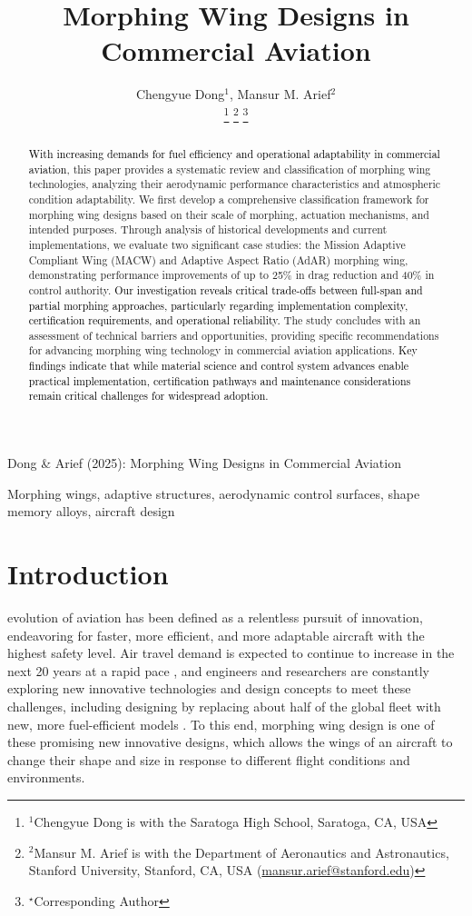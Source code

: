 \documentclass[letterpaper, journal, twoside]{IEEEtran}
\title{Morphing Wing Designs in Commercial Aviation}
\author{Chengyue Dong$^1$, Mansur M. Arief$^2$%

\thanks{$^1$Chengyue Dong is with the Saratoga High School, Saratoga, CA, USA}%
\thanks{$^2$Mansur M. Arief is with the Department of Aeronautics and Astronautics, Stanford University, Stanford, CA, USA (\url{mansur.arief@stanford.edu})
}%
\thanks{$^{\star}$Corresponding Author}%
}
\newcommand{\revision}[1]{\textcolor{black}{ #1}}
\begin{document}
{Dong \& Arief (2025): Morphing Wing Designs in Commercial Aviation}

\maketitle

\begin{abstract}
\revision{With increasing demands for fuel efficiency and operational adaptability in commercial aviation}, this paper provides a systematic review and classification of morphing wing technologies, analyzing their aerodynamic performance characteristics and atmospheric condition adaptability. We first develop a comprehensive classification framework for morphing wing designs based on their scale of morphing, actuation mechanisms, and intended purposes. Through analysis of historical developments and current implementations, we evaluate two significant case studies: the Mission Adaptive Compliant Wing (MACW) and Adaptive Aspect Ratio (AdAR) morphing wing, demonstrating performance improvements of up to 25\% in drag reduction and 40\% in control authority. \revision{Our investigation reveals critical trade-offs between full-span and partial morphing approaches, particularly regarding implementation complexity, certification requirements, and operational reliability.} The study concludes with an assessment of technical barriers and opportunities, providing specific recommendations for advancing morphing wing technology in commercial aviation applications. \revision{Key findings indicate that while material science and control system advances enable practical implementation, certification pathways and maintenance considerations remain critical challenges for widespread adoption.}
\end{abstract}

\begin{IEEEkeywords}
Morphing wings, adaptive structures, aerodynamic control surfaces, shape memory alloys, aircraft design
\end{IEEEkeywords}


\section{Introduction}

 evolution of aviation has been defined as a relentless pursuit of innovation, endeavoring for faster, more efficient, and more adaptable aircraft with the highest safety level. Air travel demand is expected to continue to increase in the next 20 years at a rapid pace \cite{boeing2023cmo}, and engineers and researchers are constantly exploring new innovative technologies and design concepts to meet these challenges, including designing by replacing about half of the global fleet with new, more fuel-efficient models \cite{investors2023boeing}. To this end, morphing wing design is one of these promising new innovative designs, which allows the wings of an aircraft to change their shape and size in response to different flight conditions and environments. 
\end{document}
